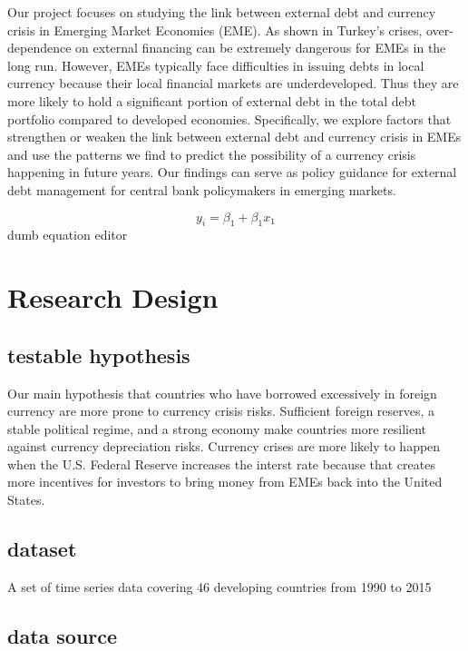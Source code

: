\documentclass[12pt,]{article}
\begin{document}
Our project focuses on studying the link between external debt and
currency crisis in Emerging Market Economies (EME). As shown in Turkey's
crises, over-dependence on external financing can be extremely dangerous
for EMEs in the long run. However, EMEs typically face difficulties in
issuing debts in local currency because their local financial markets
are underdeveloped. Thus they are more likely to hold a significant
portion of external debt in the total debt portfolio compared to
developed economies. Specifically, we explore factors that strengthen or
weaken the link between external debt and currency crisis in EMEs and
use the patterns we find to predict the possibility of a currency crisis
happening in future years. Our findings can serve as policy guidance for
external debt management for central bank policymakers in emerging
markets.

\[y_i = \beta_1 + \beta_1x_1\] dumb equation editor

\section{Research Design}\label{research-design}

\subsection{testable hypothesis}\label{testable-hypothesis}

Our main hypothesis that countries who have borrowed excessively in
foreign currency are more prone to currency crisis risks. Sufficient
foreign reserves, a stable political regime, and a strong economy make
countries more resilient against currency depreciation risks. Currency
crises are more likely to happen when the U.S. Federal Reserve increases
the interst rate because that creates more incentives for investors to
bring money from EMEs back into the United States.

\subsection{dataset}\label{dataset}

A set of time series data covering 46 developing countries from 1990 to
2015

\subsection{data source}\label{data-source}
\end{document}
